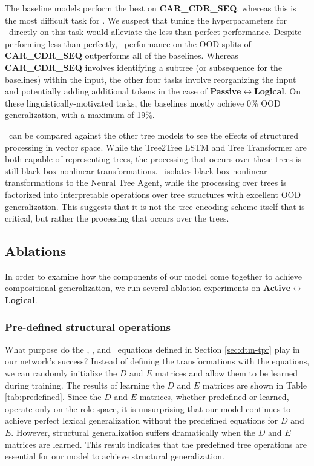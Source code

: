 The baseline models perform the best on \textbf{CAR\_CDR\_SEQ}, whereas this is the most difficult task for \blackboard. We suspect that tuning the hyperparameters for \blackboard\ directly on this task would alleviate the less-than-perfect performance. Despite performing less than perfectly, \blackboard\ performance on the OOD splits of \textbf{CAR\_CDR\_SEQ} outperforms all of the baselines. Whereas \textbf{CAR\_CDR\_SEQ} involves identifying a subtree (or subsequence for the baselines) within the input, the other four tasks involve reorganizing the input and potentially adding additional tokens in the case of \textbf{Passive$\leftrightarrow$Logical}. On these linguistically-motivated tasks, the baselines mostly achieve 0\% OOD generalization, with a maximum of 19\%.

\blackboard\ can be compared against the other tree models to see the effects of structured processing in vector space. While the Tree2Tree LSTM and Tree Transformer are both capable of representing trees, the processing that occurs over these trees is still black-box nonlinear transformations. \blackboard\ isolates black-box nonlinear transformations to the Neural Tree Agent, while the processing over trees is factorized into interpretable operations over tree structures with excellent OOD generalization. This suggests that it is not the tree encoding scheme itself that is critical, but rather the processing that occurs over the trees.

\subsection{Ablations} \label{sec:dtm-ablations}
In order to examine how the components of our model come together to achieve compositional generalization, we run several ablation experiments on \textbf{Active$\leftrightarrow$Logical}.

\subsubsection{Pre-defined structural operations}
What purpose do the \car, \cdr, and \cons\ equations defined in Section \ref{sec:dtm-tpr} play in our network's success?
Instead of defining the transformations with the equations, we can randomly initialize the $D$ and $E$ matrices and allow them to be learned during training. The results of learning the $D$ and $E$ matrices are shown in Table \ref{tab:predefined}. Since the $D$ and $E$ matrices, whether predefined or learned, operate only on the role space, it is unsurprising that our model continues to achieve perfect lexical generalization without the predefined equations for $D$ and $E$. However, structural generalization suffers dramatically when the $D$ and $E$ matrices are learned. This result indicates that the predefined tree operations are essential for our model to achieve structural generalization.


